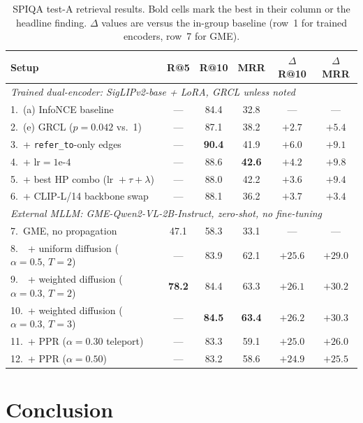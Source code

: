 \documentclass{article}
\begin{document}
\begin{table}[t]
\centering
\small
\caption{SPIQA test-A retrieval results. Bold cells mark the best in their
column or the headline finding. $\Delta$ values are versus the in-group baseline
(row~1 for trained encoders, row~7 for GME).}
\label{tab:main}
\begin{tabular}{lccccc}
\toprule
Setup & R@5 & R@10 & MRR & $\Delta$R@10 & $\Delta$MRR \\
\midrule
\multicolumn{6}{l}{\emph{Trained dual-encoder: SigLIPv2-base + LoRA, GRCL unless noted}} \\
1.\ (a) InfoNCE baseline & --- & 84.4 & 32.8 & --- & --- \\
2.\ (e) GRCL ($p\!=\!0.042$ vs.\ 1) & --- & 87.1 & 38.2 & $+2.7$ & $+5.4$ \\
3.\ + \texttt{refer\_to}-only edges & --- & \textbf{90.4} & 41.9 & $\mathbf{+6.0}$ & $+9.1$ \\
4.\ + $\text{lr}\!=\!1\mathrm{e}\text{-}4$ & --- & 88.6 & \textbf{42.6} & $+4.2$ & $\mathbf{+9.8}$ \\
5.\ + best HP combo (lr $\!+\!\tau\!+\!\lambda$) & --- & 88.0 & 42.2 & $+3.6$ & $+9.4$ \\
6.\ + CLIP-L/14 backbone swap & --- & 88.1 & 36.2 & $+3.7$ & $+3.4$ \\
\midrule
\multicolumn{6}{l}{\emph{External MLLM: GME-Qwen2-VL-2B-Instruct, zero-shot, no fine-tuning}} \\
7.\ GME, no propagation & 47.1 & 58.3 & 33.1 & --- & --- \\
8.\ \ + uniform diffusion ($\alpha\!=\!0.5,\,T\!=\!2$) & --- & 83.9 & 62.1 & $+25.6$ & $+29.0$ \\
9.\ \ + weighted diffusion ($\alpha\!=\!0.3,\,T\!=\!2$) & \textbf{78.2} & 84.4 & 63.3 & $+26.1$ & $+30.2$ \\
10.\ + weighted diffusion ($\alpha\!=\!0.3,\,T\!=\!3$) & --- & \textbf{84.5} & \textbf{63.4} & $\mathbf{+26.2}$ & $\mathbf{+30.3}$ \\
11.\ + PPR ($\alpha\!=\!0.30$ teleport) & --- & 83.3 & 59.1 & $+25.0$ & $+26.0$ \\
12.\ + PPR ($\alpha\!=\!0.50$) & --- & 83.2 & 58.6 & $+24.9$ & $+25.5$ \\
\bottomrule
\end{tabular}
\end{table}

\section{Conclusion}
\end{document}
